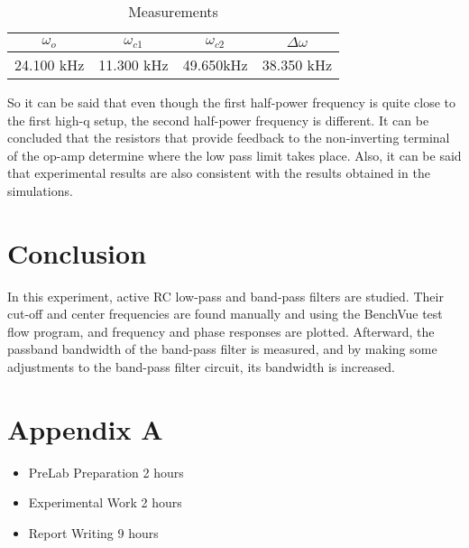 \documentclass[letterpaper,12pt]{article}
\begin{document}
\begin{table}[H]
    \begin{center}
        \caption{Measurements}
        \vspace{2mm}
        \begin{tabular}{|| c | c | c | c ||} 
            \hline
              \(\omega_o\) & \( \omega_{c1} \) & \(\omega_{c2}\)  & \(\Delta \omega\) \\ [0.5ex] 
            \hline\hline
              24.100 kHz & 11.300 kHz & 49.650kHz & 38.350 kHz  \\ 
             \hline 
        \end{tabular}
    \end{center}
\end{table}
So it can be said that even though the first half-power frequency is quite close to the first high-q setup, the second half-power frequency is different. It can be concluded that the resistors that provide feedback to the non-inverting terminal of the op-amp determine where the low pass limit takes place.  Also, it  can be said that experimental results are also consistent with the results obtained in the simulations.

\section{Conclusion}
In this experiment, active RC low-pass and band-pass filters are studied. Their cut-off and center frequencies are found manually and using the BenchVue test flow program, and frequency and phase responses are plotted. Afterward, the passband bandwidth of the band-pass filter is measured, and by making some adjustments to the band-pass filter circuit, its bandwidth is increased.

\section*{Appendix A}
\begin{itemize}
    \item PreLab Preparation 2 hours
    \item Experimental Work 2  hours
    \item Report Writing 9 hours
\end{itemize}
\end{document}
